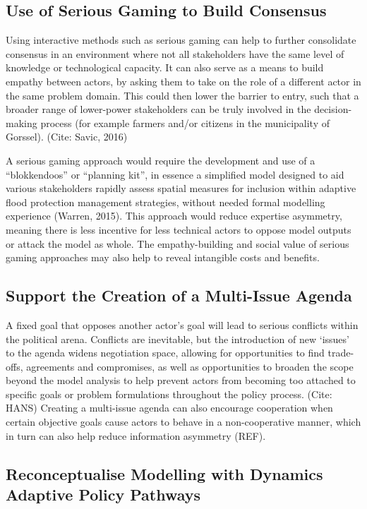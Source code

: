 \subsection{Use of Serious Gaming to Build Consensus}

Using interactive methods such as serious gaming can help to further consolidate consensus in an environment where not all stakeholders have the same level of knowledge or technological capacity. It can also serve as a means to build empathy between actors, by asking them to take on the role of a different actor in the same problem domain. This could then lower the barrier to entry, such that a broader range of lower-power stakeholders can be truly involved in the decision-making process (for example farmers and/or citizens in the municipality of Gorssel). (Cite: Savic, 2016)  

A serious gaming approach would require the development and use of a “blokkendoos” or “planning kit”, in essence a simplified model designed to aid various stakeholders rapidly assess spatial measures for inclusion within adaptive flood protection management strategies, without needed formal modelling experience (Warren, 2015). This approach would reduce expertise asymmetry, meaning there is less incentive for less technical actors to oppose model outputs or attack the model as whole. The empathy-building and social value of serious gaming approaches may also help to reveal intangible costs and benefits. 

\subsection{Support the Creation of a Multi-Issue Agenda} 

A fixed goal that opposes another actor’s goal will lead to serious conflicts within the political arena. Conflicts are inevitable, but the introduction of new ‘issues’ to the agenda widens negotiation space, allowing for opportunities to find trade-offs, agreements and compromises, as well as opportunities to broaden the scope beyond the model analysis to help prevent actors from becoming too attached to specific goals or problem formulations throughout the policy process. (Cite: HANS) Creating a multi-issue agenda can also encourage cooperation when certain objective goals cause actors to behave in a non-cooperative manner, which in turn can also help reduce information asymmetry (REF).  

\subsection{Reconceptualise Modelling with Dynamics Adaptive Policy Pathways}

